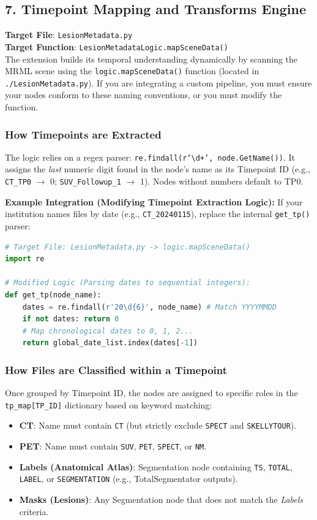 \documentclass[a4paper,10pt]{article}
\begin{document}
\subsection{7. Timepoint Mapping and Transforms Engine}
\textbf{Target File}: \texttt{LesionMetadata.py} \\
\textbf{Target Function}: \texttt{LesionMetadataLogic.mapSceneData()} \\
The extension builds its temporal understanding dynamically by scanning the MRML scene using the \texttt{logic.mapSceneData()} function (located in \texttt{./LesionMetadata.py}). If you are integrating a custom pipeline, you must ensure your nodes conform to these naming conventions, or you must modify the function.

\subsubsection*{How Timepoints are Extracted}
The logic relies on a regex parser: \texttt{re.findall(r'\textbackslash{}d+', node.GetName())}. It assigns the \textit{last} numeric digit found in the node's name as its Timepoint ID (e.g., \texttt{CT\_TP0} $\rightarrow$ 0; \texttt{SUV\_Followup\_1} $\rightarrow$ 1). Nodes without numbers default to TP0.

\textbf{Example Integration (Modifying Timepoint Extraction Logic):}
If your institution names files by date (e.g., \texttt{CT\_20240115}), replace the internal \texttt{get\_tp()} parser:
\begin{lstlisting}[language=Python]
# Target File: LesionMetadata.py -> logic.mapSceneData()
import re

# Modified Logic (Parsing dates to sequential integers):
def get_tp(node_name):
    dates = re.findall(r'20\d{6}', node_name) # Match YYYYMMDD
    if not dates: return 0
    # Map chronological dates to 0, 1, 2...
    return global_date_list.index(dates[-1])
\end{lstlisting}

\subsubsection*{How Files are Classified within a Timepoint}
Once grouped by Timepoint ID, the nodes are assigned to specific roles in the \texttt{tp\_map[TP\_ID]} dictionary based on keyword matching:
\begin{itemize}
    \item \textbf{CT}: Name must contain \texttt{CT} (but strictly exclude \texttt{SPECT} and \texttt{SKELLYTOUR}).
    \item \textbf{PET}: Name must contain \texttt{SUV}, \texttt{PET}, \texttt{SPECT}, or \texttt{NM}.
    \item \textbf{Labels (Anatomical Atlas)}: Segmentation node containing \texttt{TS}, \texttt{TOTAL}, \texttt{LABEL}, or \texttt{SEGMENTATION} (e.g., TotalSegmentator outputs).
    \item \textbf{Masks (Lesions)}: Any Segmentation node that does not match the \textit{Labels} criteria.
\end{itemize}
\end{document}

